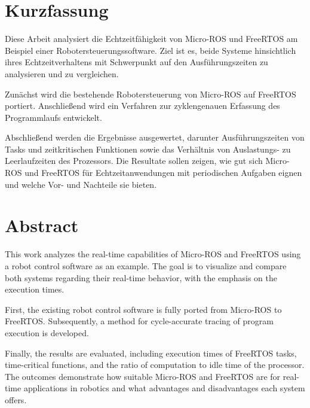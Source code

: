 \section*{Kurzfassung}

Diese Arbeit analysiert die Echtzeitfähigkeit von Micro-ROS und FreeRTOS am
Beispiel einer Robotersteuerungssoftware. Ziel ist es, beide Systeme
hinsichtlich ihres Echtzeitverhaltens mit Schwerpunkt auf den Ausführungszeiten
zu analysieren und zu vergleichen.

Zunächst wird die bestehende Robotersteuerung
von Micro-ROS auf FreeRTOS portiert. Anschließend wird ein Verfahren zur
zyklengenauen Erfassung des Programmlaufs entwickelt.

Abschließend werden die Ergebnisse ausgewertet, darunter Ausführungszeiten von
Tasks und zeitkritischen Funktionen sowie das Verhältnis von Auslastungs- zu
Leerlaufzeiten des Prozessors. Die Resultate sollen zeigen, wie gut sich
Micro-ROS und FreeRTOS für Echtzeitanwendungen mit periodischen Aufgaben eignen
und welche Vor- und Nachteile sie bieten.

\section*{Abstract}

This work analyzes the real-time capabilities of Micro-ROS and FreeRTOS using a
robot control software as an example. The goal is to visualize and compare both
systems regarding their real-time behavior, with the emphasis on the execution
times.

First, the existing robot control software is fully ported from Micro-ROS to
FreeRTOS. Subsequently, a method for cycle-accurate tracing of program execution
is developed.

Finally, the results are evaluated, including execution times of FreeRTOS tasks,
time-critical functions, and the ratio of computation to idle time of the
processor. The outcomes demonstrate how suitable Micro-ROS and FreeRTOS are for
real-time applications in robotics and what advantages and disadvantages each
system offers.
